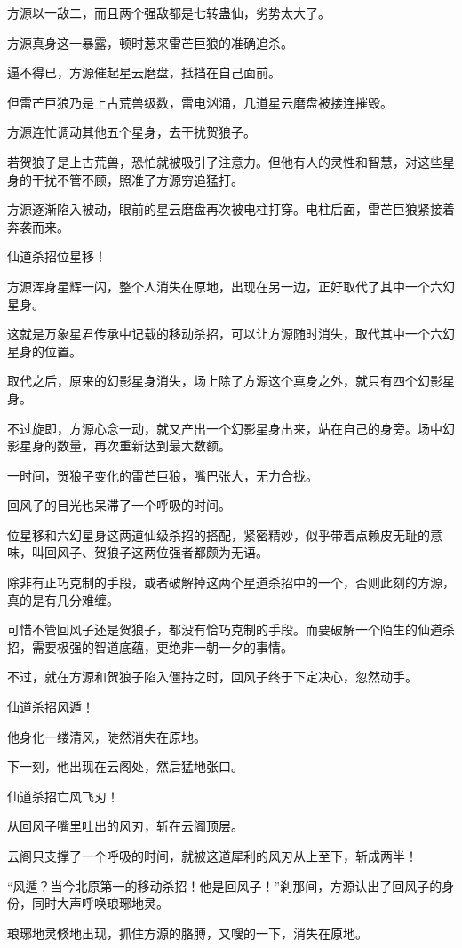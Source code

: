 \begin{this_body}
方源以一敌二，而且两个强敌都是七转蛊仙，劣势太大了。

方源真身这一暴露，顿时惹来雷芒巨狼的准确追杀。

逼不得已，方源催起星云磨盘，抵挡在自己面前。

但雷芒巨狼乃是上古荒兽级数，雷电汹涌，几道星云磨盘被接连摧毁。

方源连忙调动其他五个星身，去干扰贺狼子。

若贺狼子是上古荒兽，恐怕就被吸引了注意力。但他有人的灵性和智慧，对这些星身的干扰不管不顾，照准了方源穷追猛打。

方源逐渐陷入被动，眼前的星云磨盘再次被电柱打穿。电柱后面，雷芒巨狼紧接着奔袭而来。

仙道杀招位星移！

方源浑身星辉一闪，整个人消失在原地，出现在另一边，正好取代了其中一个六幻星身。

这就是万象星君传承中记载的移动杀招，可以让方源随时消失，取代其中一个六幻星身的位置。

取代之后，原来的幻影星身消失，场上除了方源这个真身之外，就只有四个幻影星身。

不过旋即，方源心念一动，就又产出一个幻影星身出来，站在自己的身旁。场中幻影星身的数量，再次重新达到最大数额。

一时间，贺狼子变化的雷芒巨狼，嘴巴张大，无力合拢。

回风子的目光也呆滞了一个呼吸的时间。

位星移和六幻星身这两道仙级杀招的搭配，紧密精妙，似乎带着点赖皮无耻的意味，叫回风子、贺狼子这两位强者都颇为无语。

除非有正巧克制的手段，或者破解掉这两个星道杀招中的一个，否则此刻的方源，真的是有几分难缠。

可惜不管回风子还是贺狼子，都没有恰巧克制的手段。而要破解一个陌生的仙道杀招，需要极强的智道底蕴，更绝非一朝一夕的事情。

不过，就在方源和贺狼子陷入僵持之时，回风子终于下定决心，忽然动手。

仙道杀招风遁！

他身化一缕清风，陡然消失在原地。

下一刻，他出现在云阁处，然后猛地张口。

仙道杀招亡风飞刃！

从回风子嘴里吐出的风刃，斩在云阁顶层。

云阁只支撑了一个呼吸的时间，就被这道犀利的风刃从上至下，斩成两半！

“风遁？当今北原第一的移动杀招！他是回风子！”刹那间，方源认出了回风子的身份，同时大声呼唤琅琊地灵。

琅琊地灵倏地出现，抓住方源的胳膊，又嗖的一下，消失在原地。

\end{this_body}

